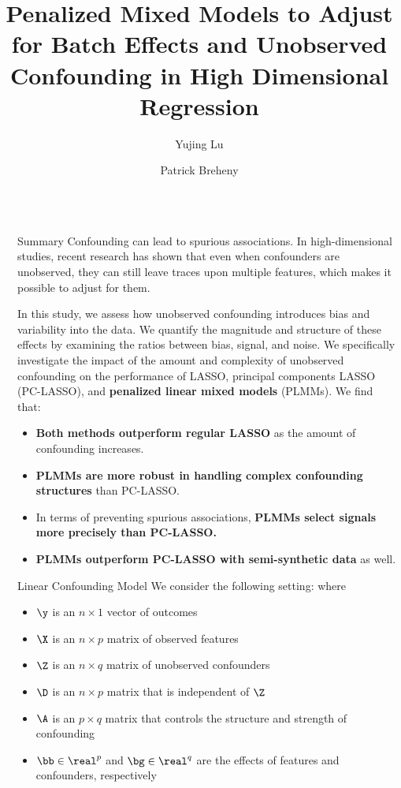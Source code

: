 \documentclass[final]{beamer}
\title{Penalized Mixed Models to Adjust for Batch Effects and Unobserved Confounding in High Dimensional Regression}
\author{Yujing Lu \and Patrick Breheny}
\institute{Department of Biostatistics, University of Iowa}
\newlength{\sepwidth}
\newlength{\colwidth}
\newcommand{\separatorcolumn}{\begin{column}{\sepwidth}\end{column}}
\begin{document}
\begin{frame}[t]
  \begin{columns}[t]
    \separatorcolumn

    \begin{column}{\colwidth}

      \begin{exampleblock}{Summary}
        Confounding can lead to spurious associations. In high-dimensional studies, recent research has shown that even when confounders are unobserved, they can still leave traces upon multiple features, which makes it possible to adjust for them. 
        
        In this study, we assess how unobserved confounding introduces bias and variability into the data. We quantify the magnitude and structure of these effects by examining the ratios between bias, signal, and noise. We specifically investigate the impact of the amount and complexity of unobserved confounding on the performance of LASSO, principal components LASSO (PC-LASSO), and \textbf{penalized linear mixed models} (PLMMs). We find that: 
        \begin{itemize}
        \item \textbf{Both methods outperform regular LASSO} as the amount of confounding increases. 
        \item \textbf{PLMMs are more robust in handling complex confounding structures} than PC-LASSO. 
        \item In terms of preventing spurious associations, \textbf{PLMMs select signals more precisely than PC-LASSO. }
        \item \textbf{PLMMs outperform PC-LASSO with semi-synthetic data} as well. 
        \end{itemize}
      \end{exampleblock}

      \begin{block}{Linear Confounding Model}
        We consider the following setting:
        where 
        \begin{itemize}
        \item $\y$ is an $n\times 1$ vector of outcomes 
        \item $\X$ is an $n\times p$ matrix of observed features 
        \item $\Z$ is an $n\times q$ matrix of unobserved confounders 
        \item $\D$ is an $n\times p$ matrix that is independent of $\Z$ 
        \item $\A$ is an $p\times q$ matrix that controls the structure and strength of confounding 
        \item $\bb \in \real^p$ and $\bg \in \real^q$ are the effects of features and confounders, respectively 
        \end{itemize}
      \end{block}


\end{column}
\end{columns}
\end{frame}
\end{document}
